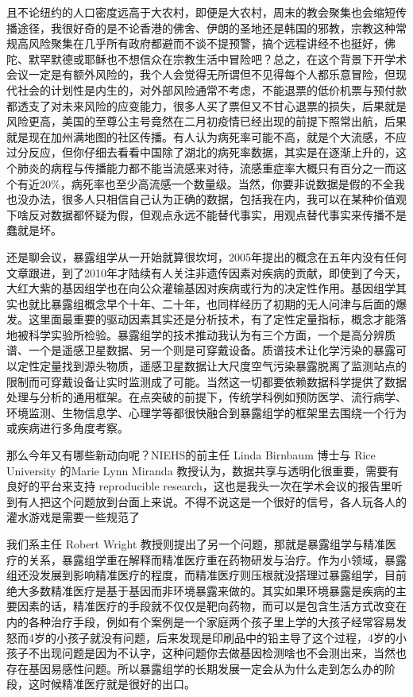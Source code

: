 \documentclass[]{book}
\begin{document}
且不论纽约的人口密度远高于大农村，即便是大农村，周末的教会聚集也会缩短传播途径，我很好奇的是不论香港的佛舍、伊朗的圣地还是韩国的邪教，宗教这种常规高风险聚集在几乎所有政府都避而不谈不提预警，搞个远程讲经不也挺好，佛陀、默罕默德或耶稣也不想信众在宗教生活中冒险吧？总之，在这个背景下开学术会议一定是有额外风险的，我个人会觉得无所谓但不见得每个人都乐意冒险，但现代社会的计划性是内生的，对外部风险通常不考虑，不能退票的低价机票与预付款都透支了对未来风险的应变能力，很多人买了票但又不甘心退票的损失，后果就是风险更高，美国的至尊公主号竟然在二月初疫情已经出现的前提下照常出航，后果就是现在加州满地图的社区传播。有人认为病死率可能不高，就是个大流感，不应过分反应，但你仔细去看看中国除了湖北的病死率数据，其实是在逐渐上升的，这个肺炎的病程与传播能力都不能当流感来对待，流感重症率大概只有百分之一而这个有近20\%，病死率也至少高流感一个数量级。当然，你要非说数据是假的不全我也没办法，很多人只相信自己认为正确的数据，包括我在内，我可以在某种价值观下啥反对数据都怀疑为假，但观点永远不能替代事实，用观点替代事实来传播不是蠢就是坏。

还是聊会议，暴露组学从一开始就算很坎坷，2005年提出的概念在五年内没有任何文章跟进，到了2010年才陆续有人关注非遗传因素对疾病的贡献，即使到了今天，大红大紫的基因组学也在向公众灌输基因对疾病或行为的决定性作用。基因组学其实也就比暴露组概念早个十年、二十年，也同样经历了初期的无人问津与后面的爆发。这里面最重要的驱动因素其实还是分析技术，有了定性定量指标，概念才能落地被科学实验所检验。暴露组学的技术推动我认为有三个方面，一个是高分辨质谱、一个是遥感卫星数据、另一个则是可穿戴设备。质谱技术让化学污染的暴露可以定性定量找到源头物质，遥感卫星数据让大尺度空气污染暴露脱离了监测站点的限制而可穿戴设备让实时监测成了可能。当然这一切都要依赖数据科学提供了数据处理与分析的通用框架。在点突破的前提下，传统学科例如预防医学、流行病学、环境监测、生物信息学、心理学等都很快融合到暴露组学的框架里去围绕一个行为或疾病进行多角度考察。

那么今年又有哪些新动向呢？NIEHS的前主任 Linda Birnbaum 博士与 Rice University 的Marie Lynn Miranda 教授认为，数据共享与透明化很重要，需要有良好的平台来支持 reproducible research，这也是我头一次在学术会议的报告里听到有人把这个问题放到台面上来说。不得不说这是一个很好的信号，各人玩各人的灌水游戏是需要一些规范了

我们系主任 Robert Wright 教授则提出了另一个问题，那就是暴露组学与精准医疗的关系，暴露组学重在解释而精准医疗重在药物研发与治疗。作为小领域，暴露组还没发展到影响精准医疗的程度，而精准医疗则压根就没搭理过暴露组学，目前绝大多数精准医疗是基于基因而非环境暴露来做的。其实如果环境暴露是疾病的主要因素的话，精准医疗的手段就不仅仅是靶向药物，而可以是包含生活方式改变在内的各种治疗手段，例如有个案例是一个家庭两个孩子里上学的大孩子经常容易发怒而4岁的小孩子就没有问题，后来发现是印刷品中的铅主导了这个过程，4岁的小孩子不出现问题是因为不认字，这种问题你去做基因检测啥也不会测出来，当然也存在基因易感性问题。所以暴露组学的长期发展一定会从为什么走到怎么办的阶段，这时候精准医疗就是很好的出口。
\end{document}
